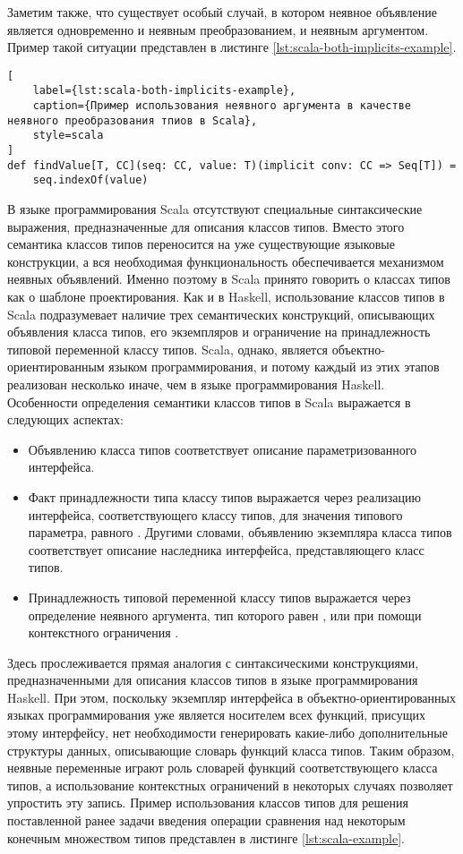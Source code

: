 Заметим также, что существует особый случай, в котором неявное объявление является одновременно и неявным преобразованием, и неявным аргументом. Пример такой ситуации представлен в листинге \ref{lst:scala-both-implicits-example}. 

\begin{lstlisting}[
    label={lst:scala-both-implicits-example},
    caption={Пример использования неявного аргумента в качестве неявного преобразования тпиов в Scala},
    style=scala
]
def findValue[T, CC](seq: CC, value: T)(implicit conv: CC => Seq[T]) = 
    seq.indexOf(value)
\end{lstlisting}

В языке программирования Scala отсутствуют специальные синтаксические выражения, предназначенные для описания классов типов. Вместо этого семантика классов типов переносится на уже существующие языковые конструкции, а вся необходимая функциональность обеспечивается механизмом неявных объявлений. Именно поэтому в Scala принято говорить о классах типов как о шаблоне проектирования. Как и в Haskell, использование классов типов в Scala подразумевает наличие трех семантических конструкций, описывающих объявления класса типов, его экземпляров и ограничение на принадлежность типовой переменной классу типов. Scala, однако, является объектно-ориентированным языком программирования, и потому каждый из этих этапов реализован несколько иначе, чем в языке программирования Haskell. Особенности определения семантики классов типов в Scala выражается в следующих аспектах:
\begin{itemize}
    \item Объявлению класса типов соответствует описание параметризованного интерфейса. 
    \item Факт принадлежности типа  классу типов выражается через реализацию интерфейса, соответствующего классу типов, для значения типового параметра, равного . Другими словами, объявлению экземпляра класса типов соответствует описание наследника интерфейса, представляющего класс типов.  
    \item Принадлежность типовой переменной  классу типов  выражается через определение неявного аргумента, тип которого равен , или при помощи контекстного ограничения .    
\end{itemize}
Здесь прослеживается прямая аналогия с синтаксическими конструкциями, предназначенными для описания классов типов в языке программирования Haskell. При этом, поскольку экземпляр интерфейса в объектно-ориентированных языках программирования уже является носителем всех функций, присущих этому интерфейсу, нет необходимости генерировать какие-либо дополнительные структуры данных, описывающие словарь функций класса типов. Таким образом, неявные переменные играют роль словарей функций соответствующего класса типов, а использование контекстных ограничений в некоторых случаях позволяет упростить эту запись. Пример использования классов типов для решения поставленной ранее задачи введения операции сравнения над некоторым конечным множеством типов представлен в листинге \ref{lst:scala-example}.

